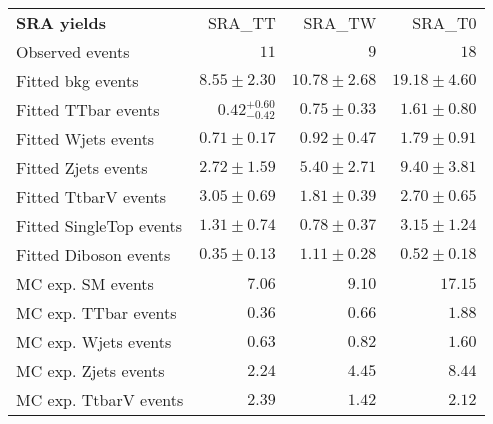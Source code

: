 

\begin{table}
\begin{center}
\setlength{\tabcolsep}{0.0pc}
{\small
\begin{tabular*}{\textwidth}{@{\extracolsep{\fill}}lrrr}
\noalign{\smallskip}\hline\noalign{\smallskip}
{\bf SRA yields}           & SRA\_TT            & SRA\_TW            & SRA\_T0              \\[-0.05cm]
\noalign{\smallskip}\hline\noalign{\smallskip}
Observed events          & $11$              & $9$              & $18$                    \\
\noalign{\smallskip}\hline\noalign{\smallskip}
Fitted bkg events         & $8.55 \pm 2.30$          & $10.78 \pm 2.68$          & $19.18 \pm 4.60$              \\
\noalign{\smallskip}\hline\noalign{\smallskip}
        Fitted TTbar events         & $0.42_{-0.42}^{+0.60}$          & $0.75 \pm 0.33$          & $1.61 \pm 0.80$              \\
        Fitted Wjets events         & $0.71 \pm 0.17$          & $0.92 \pm 0.47$          & $1.79 \pm 0.91$              \\
        Fitted Zjets events         & $2.72 \pm 1.59$          & $5.40 \pm 2.71$          & $9.40 \pm 3.81$              \\
        Fitted TtbarV events         & $3.05 \pm 0.69$          & $1.81 \pm 0.39$          & $2.70 \pm 0.65$              \\
        Fitted SingleTop events         & $1.31 \pm 0.74$          & $0.78 \pm 0.37$          & $3.15 \pm 1.24$              \\
        Fitted Diboson events         & $0.35 \pm 0.13$          & $1.11 \pm 0.28$          & $0.52 \pm 0.18$              \\
 \noalign{\smallskip}\hline\noalign{\smallskip}
MC exp. SM events              & $7.06$          & $9.10$          & $17.15$              \\
\noalign{\smallskip}\hline\noalign{\smallskip}
        MC exp. TTbar events         & $0.36$          & $0.66$          & $1.88$              \\
        MC exp. Wjets events         & $0.63$          & $0.82$          & $1.60$              \\
        MC exp. Zjets events         & $2.24$          & $4.45$          & $8.44$              \\
        MC exp. TtbarV events         & $2.39$          & $1.42$          & $2.12$              \\

\end{tabular*}}
\end{center}
\end{table}
